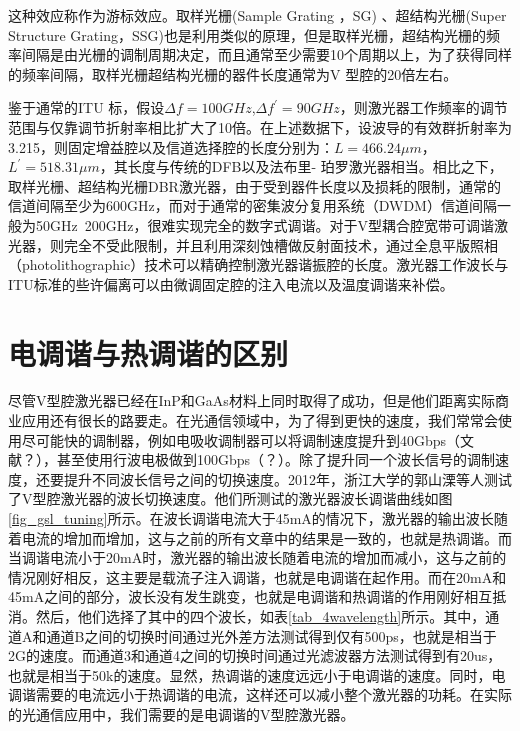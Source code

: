 \documentclass{ZJUthesis}
\begin{document}
这种效应称作为游标效应。取样光栅(Sample Grating ，SG) 、超结构光栅(Super Structure Grating，SSG)也是利用类似的原理，但是取样光栅，超结构光栅的频率间隔是由光栅的调制周期决定，而且通常至少需要10个周期以上，为了获得同样的频率间隔，取样光栅超结构光栅的器件长度通常为V 型腔的20倍左右。

鉴于通常的ITU 标，假设$\Delta f=100GHz$,$\Delta f^\prime=90GHz$，则激光器工作频率的调节范围与仅靠调节折射率相比扩大了10倍。在上述数据下，设波导的有效群折射率为3.215，则固定增益腔以及信道选择腔的长度分别为：$L=466.24\mu m$，$L^\prime=518.31\mu m$，其长度与传统的DFB以及法布里- 珀罗激光器相当。相比之下，取样光栅、超结构光栅DBR激光器，由于受到器件长度以及损耗的限制，通常的信道间隔至少为600GHz，而对于通常的密集波分复用系统（DWDM）信道间隔一般为50GHz~200GHz，很难实现完全的数字式调谐。对于V型耦合腔宽带可调谐激光器，则完全不受此限制，并且利用深刻蚀槽做反射面技术，通过全息平版照相（photolithographic）技术可以精确控制激光器谐振腔的长度。激光器工作波长与ITU标准的些许偏离可以由微调固定腔的注入电流以及温度调谐来补偿。

\section{电调谐与热调谐的区别}

尽管V型腔激光器已经在InP和GaAs材料上同时取得了成功，但是他们距离实际商业应用还有很长的路要走。在光通信领域中，为了得到更快的速度，我们常常会使用尽可能快的调制器，例如电吸收调制器可以将调制速度提升到40Gbps（文献？），甚至使用行波电极做到100Gbps（？）。除了提升同一个波长信号的调制速度，还要提升不同波长信号之间的切换速度。2012年，浙江大学的郭山溧等人测试了V型腔激光器的波长切换速度\cite{guo2012experimental}。他们所测试的激光器波长调谐曲线如图\ref{fig_gsl_tuning}所示。在波长调谐电流大于45mA的情况下，激光器的输出波长随着电流的增加而增加，这与之前的所有文章中的结果是一致的，也就是热调谐。而当调谐电流小于20mA时，激光器的输出波长随着电流的增加而减小，这与之前的情况刚好相反，这主要是载流子注入调谐，也就是电调谐在起作用。而在20mA和45mA之间的部分，波长没有发生跳变，也就是电调谐和热调谐的作用刚好相互抵消。然后，他们选择了其中的四个波长，如表\ref{tab_4wavelength}所示。其中，通道A和通道B之间的切换时间通过光外差方法测试得到仅有500ps，也就是相当于2G的速度。而通道3和通道4之间的切换时间通过光滤波器方法测试得到有20us，也就是相当于50k的速度。显然，热调谐的速度远远小于电调谐的速度。同时，电调谐需要的电流远小于热调谐的电流，这样还可以减小整个激光器的功耗。在实际的光通信应用中，我们需要的是电调谐的V型腔激光器。
\end{document}
